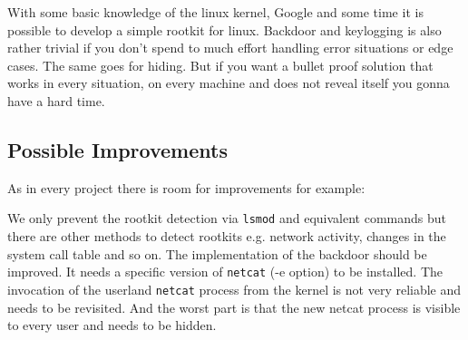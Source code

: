 \documentclass[12pt]{article}
\newcommand{\shellcmdinline}[1]{\texttt{\footnotesize #1}}
\begin{document}
With some basic knowledge of the linux kernel, Google and some time it is possible to develop a simple rootkit for linux. Backdoor and keylogging is also rather trivial if you don't spend to much effort handling error situations or edge cases. The same goes for hiding. But if you want a bullet proof solution that works in every situation, on every machine and does not reveal itself you gonna have a hard time. 

\label{sec:conc}
\subsection{Possible Improvements}
As in every project there is room for improvements for example:

We only prevent the rootkit detection via \shellcmdinline{lsmod} and equivalent commands but there are other methods to detect rootkits e.g. network activity, changes in the system call table and so on. The implementation of the backdoor should be improved. It needs a specific version of \shellcmdinline{netcat} (-e option) to be installed. The invocation of the userland \shellcmdinline{netcat} process from the kernel is not very reliable and needs to be revisited. And the worst part is that the new netcat process is visible to every user and needs to be hidden.
\cite{a1}
\nocite{a1}
\nocite{b2}
\nocite{c3}
\nocite{d4}
\nocite{e5}
\nocite{f6}


{}

\end{document}
